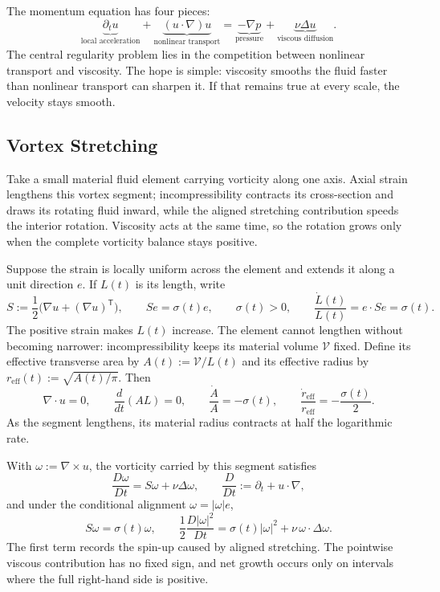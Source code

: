 
The momentum equation has four pieces:
\[
  \underbrace{\partial_t u}_{\text{local acceleration}}
  +
  \underbrace{(u\cdot\nabla)u}_{\text{nonlinear transport}}
  =
  \underbrace{-\nabla p}_{\text{pressure}}
  +
  \underbrace{\nu\Delta u}_{\text{viscous diffusion}}.
\]
The central regularity problem lies in the competition between nonlinear transport and viscosity.
The hope is simple: viscosity smooths the fluid faster than nonlinear transport can sharpen it.
If that remains true at every scale, the velocity stays smooth.

\subsection{Vortex Stretching}\label{sub:ThePerfectlyStretchingVortex}

Take a small material fluid element carrying vorticity along one axis. Axial strain lengthens this vortex segment; incompressibility contracts its cross-section and draws its rotating fluid inward, while the aligned stretching contribution speeds the interior rotation. Viscosity acts at the same time, so the rotation grows only when the complete vorticity balance stays positive.

Suppose the strain is locally uniform across the element and extends it along a unit direction \(e\). If \(L(t)\) is its length, write
\[
  S:=\frac12\bigl(\nabla u+(\nabla u)^{\mathsf T}\bigr),
  \qquad
  Se=\sigma(t)e,
  \qquad
  \sigma(t)>0,
  \qquad
  \frac{\dot L(t)}{L(t)}
  =
  e\cdot Se
  =
  \sigma(t).
\]
The positive strain makes \(L(t)\) increase. The element cannot lengthen without becoming narrower: incompressibility keeps its material volume \(\mathcal V\) fixed. Define its effective transverse area by \(A(t):=\mathcal V/L(t)\) and its effective radius by \(r_{\mathrm{eff}}(t):=\sqrt{A(t)/\pi}\). Then
\[
  \nabla\cdot u=0,
  \qquad
  \frac{d}{dt}(A L)=0,
  \qquad
  \frac{\dot A}{A}=-\sigma(t),
  \qquad
  \frac{\dot r_{\mathrm{eff}}}{r_{\mathrm{eff}}}
  =
  -\frac{\sigma(t)}{2}.
\]
As the segment lengthens, its material radius contracts at half the logarithmic rate.

With \(\omega:=\nabla\times u\), the vorticity carried by this segment satisfies
\[
  \frac{D\omega}{Dt}
  =
  S\omega+\nu\Delta\omega,
  \qquad
  \frac{D}{Dt}
  :=
  \partial_t+u\cdot\nabla,
\]
and under the conditional alignment \(\omega=|\omega|e\),
\[
  S\omega
  =
  \sigma(t)\omega,
  \qquad
  \frac12\frac{D|\omega|^2}{Dt}
  =
  \sigma(t)|\omega|^2
  +
  \nu\,\omega\cdot\Delta\omega.
\]
The first term records the spin-up caused by aligned stretching. The pointwise viscous contribution has no fixed sign, and net growth occurs only on intervals where the full right-hand side is positive.

